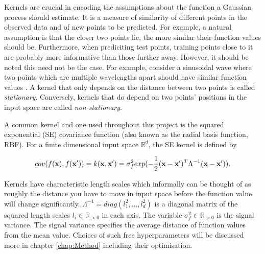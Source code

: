 \documentclass[12pt,a4paper]{report}
\theoremstyle{definition}
\begin{document}
Kernels are crucial in encoding the assumptions about the function a Gaussian process should estimate. 
It is a measure of similarity of different points in the observed data and of new points to be predicted. 
For example, a natural assumption is that the closer two points lie, the more similar their function values should be. 
Furthermore, when prediciting test points, training points close to it are probably more informative than those further away. 
However, it should be noted this need not be the case. 
For example, consider a sinusoidal wave where two points which are multiple wavelengths apart should have similar function values \citep{Kaiser2017}.
A kernel that only depends on the distance between two points is called \emph{stationary}.
Conversely, kernels that do depend on two points' positions in the input space are called \emph{non-stationary}.

A common kernel and one used throughout this project is the squared exponential (SE) covariance function (also known as the radial basis function, RBF). 
For a finite dimensional input space $\mathbb{R}^d$, the SE kernel is defined by

\begin{equation}
	\centering
	cov(f(\textbf{x}), f(\textbf{x}')) = k(\textbf{x}, \textbf{x}') = \sigma_{f}^2 exp(-\frac{1}{2} (\textbf{x} - \textbf{x}')^T \Lambda^{-1} (\textbf{x} - \textbf{x}')).
	\label{eq:SquaredExponentialKernel}
\end{equation}

Kernels have characteristic length scales which informally can be thought of as roughly the distance you have to move in input space before the function value will change significantly. 
$\Lambda^{-1}  = diag(l_{1}^2, ... , l_{d}^2)$ is a diagonal matrix of the squared length scales $l_{i} \in \mathbb{R}_{>0}$ in each axis.
The variable $\sigma_{f}^2 \in \mathbb{R}_{>0}$ is the signal variance.
The signal variance specifies the average distance of function values from the mean value.
Choices of such free hyperparameters will be discussed more in chapter \ref{chap:Method} including their optimisation. 
\end{document}
